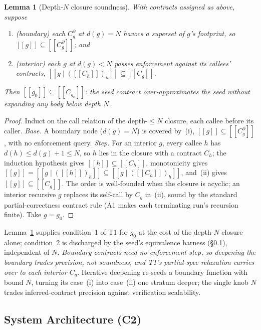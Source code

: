 \documentclass[conference]{IEEEtran}
\newtheorem{lemma}{Lemma}
\theoremstyle{definition}
\theoremstyle{remark}
\newcommand{\sem}[1]{[\![#1]\!]}
\begin{document}
\begin{lemma}[Depth-$N$ closure soundness]\label{lem:depth}
  With contracts assigned as above, suppose
  \begin{enumerate}
    \item[(i)] \emph{(boundary)} each $C^{\partial}_g$ at $d(g)=N$ havocs a
      superset of $g$'s footprint, so
      $\sem{g}\subseteq\sem{C^{\partial}_g}$; and
    \item[(ii)] \emph{(interior)} each $g$ at $d(g)<N$ passes enforcement
      against its callees' contracts,
      $\sem{g\mid(\sem{C_h})_h}\subseteq\sem{C_g}$.
  \end{enumerate}
  Then $\sem{g_0}\subseteq\sem{C_{g_0}}$: the seed contract
  over-approximates the
  seed without expanding any body below depth $N$.
\end{lemma}
\begin{proof}
  Induct on the call relation of the depth-$\le N$ closure, each callee before
  its caller. \emph{Base.} A boundary node ($d(g)=N$) is covered by~(i),
  $\sem{g}\subseteq\sem{C^{\partial}_g}$, with no enforcement query.
  \emph{Step.} For an interior $g$, every callee $h$ has $d(h)\le d(g)+1\le N$,
  so $h$ lies in the closure with a contract $C_h$; the induction hypothesis
  gives $\sem{h}\subseteq\sem{C_h}$, monotonicity gives
  $\sem{g}=\sem{g\mid(\sem{h})_h}\subseteq\sem{g\mid(\sem{C_h})_h}$, and~(ii)
  gives $\sem{g}\subseteq\sem{C_g}$. The order is well-founded when the closure
  is acyclic; an interior recursive $g$ replaces its self-call by $C_g$ in~(ii),
  sound by the standard partial-correctness contract rule (A1 makes each
  terminating run's recursion finite). Take $g=g_0$.
\end{proof}

Lemma~\ref{lem:depth} supplies condition~1 of T1 for $g_0$ at the cost of the
depth-$N$ closure alone; condition~2 is discharged by the seed's equivalence
harness (\S\ref{subsec:system}), independent of $N$. \textit{Boundary
  contracts need no
  enforcement step, so deepening the boundary trades precision, not
  soundness, and
T1's partial-spec relaxation carries over to each interior $C_g$}. Iterative
deepening re-seeds a boundary function with bound $N$, turning its case~(i) into
case~(ii) one stratum deeper; the single knob $N$ trades inferred-contract
precision against verification scalability.

\subsection{System Architecture (C2)}\label{subsec:system}
\end{document}
